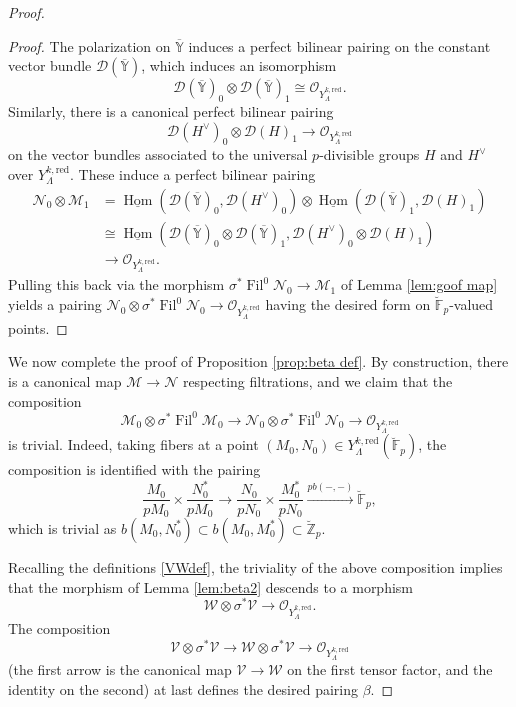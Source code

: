 \documentclass[11pt]{alggeom}
\newcommand{\map}[1]{\xrightarrow{#1}}
\newcommand{\iso}{\cong}
\newcommand{\red}{\mathrm{red}}
\newcommand{\Z}{\mathbb Z}
\newcommand{\F}{\mathbb F}
\newcommand{\co}{\mathcal O}
\DeclareMathOperator{\Hom}{Hom}
\DeclareMathOperator{\Fil}{Fil}
\begin{document}
\begin{proof}
\begin{proof}
The polarization on  $\overline{\mathbb{Y}}$ induces  a perfect bilinear pairing on the constant vector bundle $\mathcal{D}(\overline{\mathbb{Y}})$, which induces an isomorphism
\[
\mathcal{D}(\overline{\mathbb{Y}})_0 \otimes  \mathcal{D}(\overline{\mathbb{Y}})_1 \iso  \co_{Y^{k,\red}_\Lambda}.
\]
Similarly, there is a  canonical perfect bilinear pairing
\[
\mathcal{D}( H^\vee )_0 \otimes \mathcal{D}(H)_1 \to   \co_{Y^{k,\red}_\Lambda}
\]
on the vector bundles associated to the universal $p$-divisible groups $H$ and $H^\vee$ over $Y^{k,\red}_\Lambda$.  
These induce a perfect bilinear pairing
\begin{align*}
\mathscr{N}_0  \otimes  \mathscr{M}_1
& =  \underline{\Hom}( \mathcal{D}(\overline{\mathbb{Y}})_0 , \mathcal{D}(H^\vee)_0) 
\otimes \underline{\Hom}( \mathcal{D}(\overline{\mathbb{Y}})_1 , \mathcal{D}(H)_1)  \\
& \iso  \underline{\Hom}( \mathcal{D}(\overline{\mathbb{Y}})_0 \otimes \mathcal{D}(\overline{\mathbb{Y}})_1 , \mathcal{D}(H^\vee)_0 \otimes  \mathcal{D}(H)_1)  \\
& \to \co_{Y^{k,\red}_\Lambda}.
\end{align*}
Pulling this  back via the morphism $\sigma^*\Fil^0 \mathscr{N}_0 \to \mathscr{M}_1$ of Lemma \ref{lem:goof map} yields a pairing $\mathscr{N}_0 \otimes \sigma^* \Fil^0 \mathscr{N}_0 \to \co_{Y^{k,\red}_\Lambda}$ having the desired form on  $\breve{\F}_p$-valued points.
\end{proof}


We  now complete the proof of Proposition \ref{prop:beta def}. 
By construction, there is a canonical map $\mathscr{M} \to \mathscr{N}$ respecting filtrations, and we claim that the  composition 
\[
\mathscr{M}_0 \otimes \sigma^* \Fil^0 \mathscr{M}_0 \to \mathscr{N}_0 \otimes \sigma^* \Fil^0 \mathscr{N}_0 \to \co_{Y^{k,\red}_\Lambda}
\]
is trivial. Indeed, taking  fibers  at a point $(M_0,N_0) \in Y_\Lambda^{k,\red}(\breve{\F}_p)$,  the composition is identified with the pairing
\[
\frac{M_0}{pM_0} \times \frac{N_0^*}{pM_0} \to  \frac{N_0}{pN_0} \times \frac{M_0^*}{pN_0}
 \map{pb( - , - )} \breve{\F}_p,
\]
which is trivial as
$
b(M_0,N_0^*) \subset b(M_0,M_0^*) \subset \breve{\Z}_p.
$


Recalling the definitions \eqref{VWdef}, the triviality of the above composition implies that  the morphism of Lemma \ref{lem:beta2}  descends to a morphism
\[
\mathscr{W} \otimes \sigma^* \mathscr{V} \to \co_{Y^{k,\red}_\Lambda}.
\]
The composition
\[
\mathscr{V} \otimes \sigma^*\mathscr{V} \to \mathscr{W} \otimes \sigma^*\mathscr{V} \to \co_{Y_\Lambda^{k,\red}}
\]
(the first arrow is the canonical map $\mathscr{V} \to \mathscr{W}$ on the first tensor factor, and the identity on the second)  
at last defines the desired pairing $\beta$. 
\end{proof}
\end{document}
